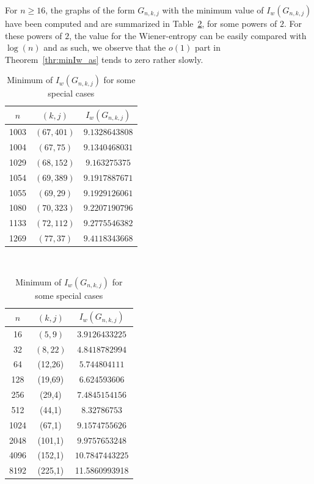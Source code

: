 \documentclass{article}
\begin{document}
{For $n \ge 16$, the graphs of the form $G_{n,k,j}$ with the minimum value of $I_w(G_{n,k,j})$ have been computed and are summarized in Table~\ref{table:minIW}, for some powers of $2.$
For these powers of $2$, the value for the Wiener-entropy can be easily compared with $\log(n)$ and as such, we observe that the $o(1)$ part in Theorem~\ref{thr:minIw_as} tends to zero rather slowly.

\begin{table}[h]

\begin{minipage}[b]{.45\linewidth}
\begin{center}
    \begin{tabular}{|c|c|c|}
	\hline
	\textbf{$n$} & \textbf{$(k,j)$} & \textbf{$I_w(G_{n,k,j})$} \\
	\hline
1003&$(67,401)$& $9.1328643808$\\
1004&$(67,75)$& $9.1340468031$\\
1029&$(68,152)$& $9.163275375$\\
1054&$(69,389)$& $9.1917887671$\\
1055&$(69,29)$& $9.1929126061$\\
1080&$(70,323)$& $9.2207190796$\\
1133&$(72,112)$& $9.2775546382$\\
1269&$(77,37)$& 
$9.4118343668$\\
	\hline
	\end{tabular}\\
\label{table:minIW_jnot1}
\end{center}
\end{minipage}\quad\begin{minipage}[b]{.45\linewidth}

\begin{center}
\begin{tabular}{|c|c|c|}
	\hline
	\textbf{$n$} & \textbf{$(k,j)$} & \textbf{$I_w(G_{n,k,j})$} \\
	\hline
	16 & $(5,9)$ & $3.9126433225$ 	 \\ 	
	32 & $(8,22)$ & $4.8418782994$ \\ 	
    64 & (12,26) & $5.744804111$\\
    128& (19,69) & 6.624593606\\
    256& (29,4)& $7.4845154156$\\
    512& (44,1)  & $8.32786753$\\
    1024& (67,1) & $9.1574755626$\\
    2048& (101,1) & $9.9757653248$\\
    4096& (152,1) & $10.7847443225$\\
    8192& (225,1) & 11.5860993918\\
	\hline
	\end{tabular}\\
	\label{table:minIW}
\end{center}
\end{minipage}
\caption{Minimum of $I_w(G_{n,k,j})$ for some special cases}
\end{table}

}
\end{document}
